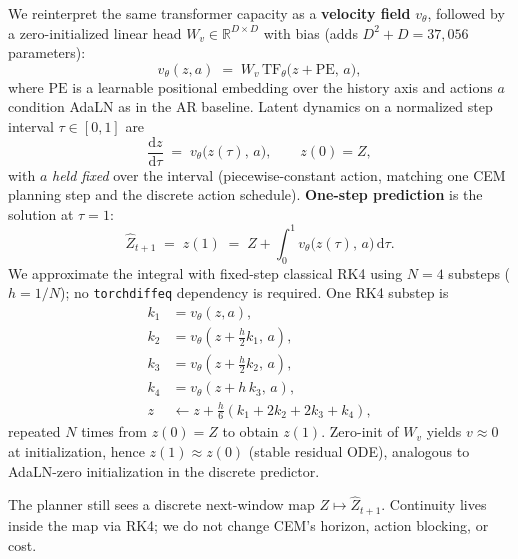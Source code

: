 We reinterpret the same transformer capacity as a
\textbf{velocity field} $v_\theta$, followed by a zero-initialized
linear head $W_v\in\mathbb{R}^{D\times D}$ with bias
(adds $D^2{+}D{=}37{,}056$ parameters):
\begin{equation}
  v_\theta(z, a)
  \;=\;
  W_v\,\mathrm{TF}_\theta\bigl(z + \mathrm{PE},\, a\bigr),
  \label{eq:velocity}
\end{equation}
where $\mathrm{PE}$ is a learnable positional embedding over the
history axis and actions $a$ condition AdaLN as in the AR baseline.
Latent dynamics on a normalized step interval $\tau\in[0,1]$ are
\begin{equation}
  \frac{\mathrm{d}z}{\mathrm{d}\tau}
  \;=\;
  v_\theta\bigl(z(\tau),\, a\bigr),
  \qquad
  z(0) = Z,
  \label{eq:ode}
\end{equation}
with $a$ \emph{held fixed} over the interval (piecewise-constant
action, matching one CEM planning step and the discrete action
schedule).
\textbf{One-step prediction} is the solution at $\tau{=}1$:
\begin{equation}
  \hat Z_{t+1}
  \;=\;
  z(1)
  \;=\;
  Z + \int_{0}^{1} v_\theta\bigl(z(\tau),\, a\bigr)\, \mathrm{d}\tau.
  \label{eq:onestep}
\end{equation}
We approximate the integral with fixed-step classical RK4 using
$N{=}4$ substeps ($h{=}1/N$); no \texttt{torchdiffeq} dependency is
required.
One RK4 substep is
\begin{align}
  k_1 &= v_\theta(z,a), \nonumber\\
  k_2 &= v_\theta(z + \tfrac{h}{2}k_1,\, a), \nonumber\\
  k_3 &= v_\theta(z + \tfrac{h}{2}k_2,\, a), \nonumber\\
  k_4 &= v_\theta(z + h\,k_3,\, a), \nonumber\\
  z &\leftarrow z + \tfrac{h}{6}(k_1 + 2k_2 + 2k_3 + k_4),
  \label{eq:rk4}
\end{align}
repeated $N$ times from $z(0)=Z$ to obtain $z(1)$.
Zero-init of $W_v$ yields $v\approx 0$ at initialization, hence
$z(1)\approx z(0)$ (stable residual ODE), analogous to AdaLN-zero
initialization in the discrete predictor.

\begin{remark}
The planner still sees a discrete next-window map
$Z\mapsto\hat Z_{t+1}$.
Continuity lives inside the map via RK4; we do not change CEM's
horizon, action blocking, or cost.
\end{remark}


